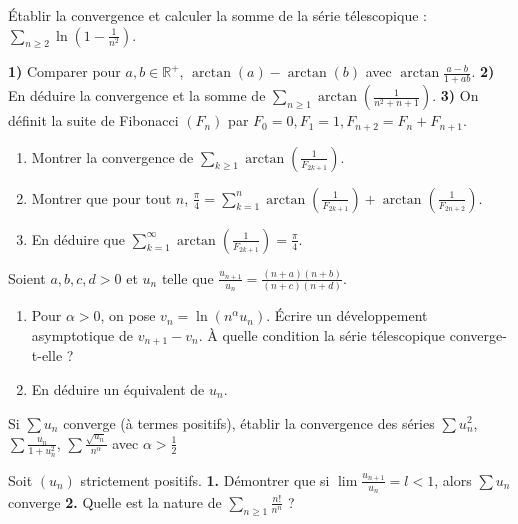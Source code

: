 \begin{exercice}
Établir la convergence et calculer la somme de la série télescopique : $\sum_{n\ge2}\ln(1-\frac{1}{n^{2}})$.
\end{exercice}

\begin{exercice}
\textbf{1)} Comparer pour $a, b \in \mathbb{R}^{+}$, $\arctan(a) - \arctan(b)$ avec $\arctan \frac{a-b}{1+ab}$.
\textbf{2)} En déduire la convergence et la somme de $\sum_{n\ge1}\arctan(\frac{1}{n^{2}+n+1})$.
\textbf{3)} On définit la suite de Fibonacci $(F_{n})$ par $F_{0}=0, F_{1}=1, F_{n+2}=F_{n}+F_{n+1}$.
\begin{enumerate}
    \item Montrer la convergence de $\sum_{k\ge1}\arctan(\frac{1}{F_{2k+1}})$.
    \item Montrer que pour tout $n$, $\frac{\pi}{4}=\sum_{k=1}^{n}\arctan(\frac{1}{F_{2k+1}})+\arctan(\frac{1}{F_{2n+2}})$.
    \item En déduire que $\sum_{k=1}^{\infty}\arctan(\frac{1}{F_{2k+1}}) = \frac{\pi}{4}$.
\end{enumerate}
\end{exercice}

\begin{exercice}
Soient $a, b, c, d > 0$ et $u_{n}$ telle que $\frac{u_{n+1}}{u_{n}}=\frac{(n+a)(n+b)}{(n+c)(n+d)}$.
\begin{enumerate}
    \item Pour $\alpha>0$, on pose $v_{n}=\ln(n^{\alpha}u_{n})$. Écrire un développement asymptotique de $v_{n+1}-v_{n}$. À quelle condition la série télescopique converge-t-elle ?
    \item En déduire un équivalent de $u_{n}$.
\end{enumerate}
\end{exercice}

\begin{exercice}
Si $\sum u_{n}$ converge (à termes positifs), établir la convergence des séries $\sum u_{n}^{2}$, $\sum\frac{u_{n}}{1+u_{n}^{2}}$, $\sum\frac{\sqrt{u_{n}}}{n^{\alpha}}$ avec $\alpha>\frac{1}{2}$
\end{exercice}

\begin{exercice}
Soit $(u_{n})$ strictement positifs.
\textbf{1.} Démontrer que si $\lim \frac{u_{n+1}}{u_{n}}=l < 1$, alors $\sum u_{n}$ converge
\textbf{2.} Quelle est la nature de $\sum_{n\ge1}\frac{n!}{n^{n}}$ ?
\end{exercice}

